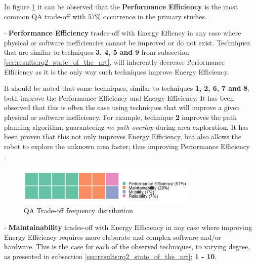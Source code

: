 \vspace{2mm}

In figure \ref{fig:trade_off_freq} it can be observed that the \textbf{Performance Efficiency} is the most common QA trade-off with 57\% occurrence in the primary studies.

\vspace{2mm}

- \textbf{Performance Efficiency} trades-off with Energy Effiency in any case where physical or software inefficiencies cannot be improved or do not exist. 
Techniques that are similar to techniques \textbf{3, 4, 5 and 9} from subsection \ref{sec:results:rq2_state_of_the_art}, 
will inherently decrease Performance Efficiency as it is the only way such techniques improve Energy Efficiency.

\vspace{2mm}

It should be noted that some techniques, similar to techniques \textbf{1, 2, 6, 7 and 8}, both improve the Performance Efficiency and Energy Efficiency. 
It has been observed that this is often the case using techniques that will improve a given physical or software inefficiency. 
For example, technique \textbf{2} improves the path planning algorithm, guaranteeing \textit{no path overlap} during area exploration. 
It has been proven that this not only improves Energy Efficiency, but also allows the robot to explore the unknown area faster; 
thus improving Performance Efficiency \cite{mei2006mobile_exploration}.

\vspace{2mm}

\begin{figure}[t]
    \includegraphics[width=250pt]{figures/waffle_tradeoff_freq.png}
    \caption{QA Trade-off frequency distribution}
    \label{fig:trade_off_freq}
\end{figure}

- \textbf{Maintainability} trades-off with Energy Efficiency in any case where improving Energy Efficiency requires more elaborate and complex software and/or hardware. 
This is the case for each of the observed techniques, to varying degree, as presented in subsection \ref{sec:results:rq2_state_of_the_art}; \textbf{1 - 10}.

\vspace{2mm}


